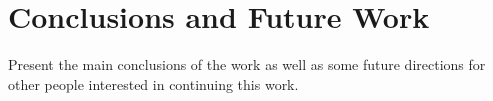 \documentclass[10pt,twocolumn,letterpaper]{article}
\begin{document}
\section{Conclusions and Future Work}
Present the main conclusions of the work as well as some future directions for other people interested in continuing this work. 

{\small


}
\end{document}
